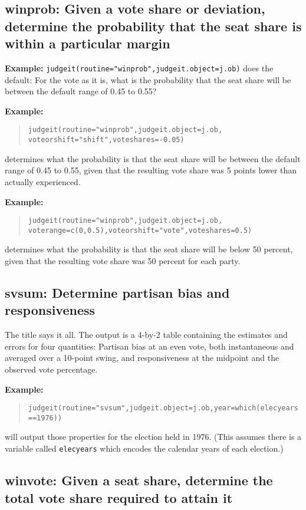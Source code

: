 \documentclass[oneside,letterpaper,titlepage]{article}
\begin{document}
\subsection{winprob: Given a vote share or deviation, determine the probability that the seat share is within a particular margin}

\textbf{Example:}
\texttt{judgeit(routine="winprob",judgeit.object=j.ob)} does the
default: For the vote as it is, what is the probability that the seat
share will be between the default range of 0.45 to 0.55?

\textbf{Example:}
\begin{quote} \texttt{judgeit(routine="winprob",judgeit.object=j.ob, \\
  voteorshift="shift",voteshares=-0.05)} \end{quote} determines what the
probability is that the seat share will be between the default range
of 0.45 to 0.55, given that the resulting vote share was 5 points
lower than actually experienced.

\textbf{Example:}
\begin{quote}\texttt{judgeit(routine="winprob",judgeit.object=j.ob, \\
voterange=c(0,0.5),voteorshift="vote",voteshares=0.5)} \end{quote}
determines what the probability is that the seat share will be below
50 percent, given that the resulting vote share was 50 percent for
each party.

\subsection{svsum: Determine partisan bias and responsiveness}

The title says it all. The output is a 4-by-2 table containing the
estimates and errors for four quantities: Partisan bias at an even
vote, both instantaneous and averaged over a 10-point swing, and
responsiveness at the midpoint and the observed vote percentage.

\textbf{Example:}
\begin{quote} \texttt{judgeit(routine="svsum",judgeit.object=j.ob,year=which(elecyears==1976))} \end{quote}
will output those properties for the election held in 1976. (This
assumes there is a variable called \texttt{elecyears} which encodes
the calendar years of each election.)

\subsection{winvote: Given a seat share, determine the total vote share required to attain it}
\end{document}
